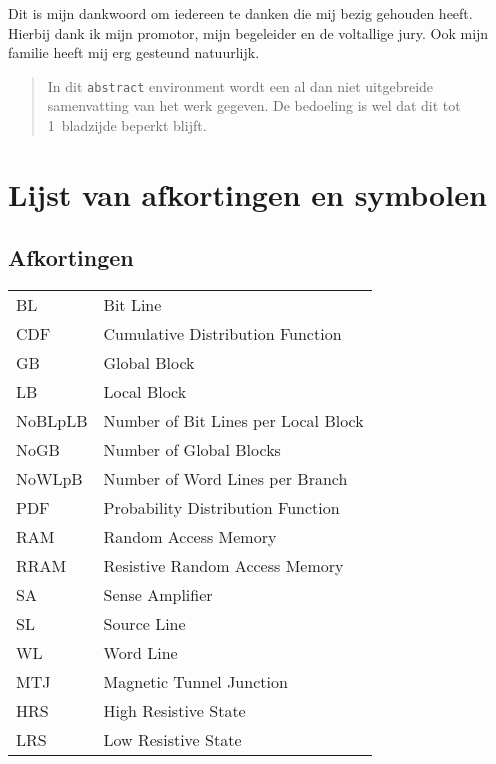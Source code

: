 \documentclass[master=elt,masteroption=eg]{kulemt}
\begin{document}
\begin{preface}
  Dit is mijn dankwoord om iedereen te danken die mij bezig gehouden heeft.
  Hierbij dank ik mijn promotor, mijn begeleider en de voltallige jury.
  Ook mijn familie heeft mij erg gesteund natuurlijk.
\end{preface}

\tableofcontents*

\begin{abstract}
  In dit \texttt{abstract} environment wordt een al dan niet uitgebreide
  samenvatting van het werk gegeven. De bedoeling is wel dat dit tot
  1~bladzijde beperkt blijft.

  \lipsum[1]
\end{abstract}

\listoffiguresandtables
\chapter{Lijst van afkortingen en symbolen}
\section*{Afkortingen}
\begin{flushleft}
  \renewcommand{\arraystretch}{1.1}
  \begin{tabularx}{\textwidth}{@{}p{18mm}X@{}}
    BL   & Bit Line \\
    CDF & Cumulative Distribution Function  \\
    GB & Global Block \\
    LB & Local Block \\
    NoBLpLB & Number of Bit Lines per Local Block \\
    NoGB & Number of Global Blocks \\
    NoWLpB & Number of Word Lines per Branch \\
    PDF & Probability Distribution Function \\
    RAM   & Random Access Memory \\
    RRAM & Resistive Random Access Memory \\
    SA & Sense Amplifier \\
    SL & Source Line \\
    WL  & Word Line \\
    MTJ & Magnetic Tunnel Junction \\
    HRS & High Resistive State \\
    LRS & Low Resistive State  \\
  \end{tabularx}
\end{flushleft}
\end{document}
